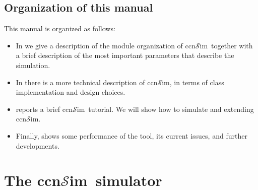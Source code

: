\documentclass{book}
\newcommand{\ccnsim}{ccn$\mathcal{S}$im}
\begin{document}
\section{Organization of this manual}
This manual is organized as follows:
\begin{itemize}
    \item  In   we give a description of the module organization of \ccnsim\ together with a brief description of the most important parameters that describe the simulation.
    \item In   there is a more technical description of \ccnsim, in terms of class implementation and design choices. 
    \item {} reports a brief \ccnsim\ tutorial. We will show how to simulate and extending \ccnsim. 
    \item Finally,  shows some performance of the tool, its current issues, and further developments.
\end{itemize}


\chapter{The \ccnsim\ simulator}\label{ch:details}
\end{document}
